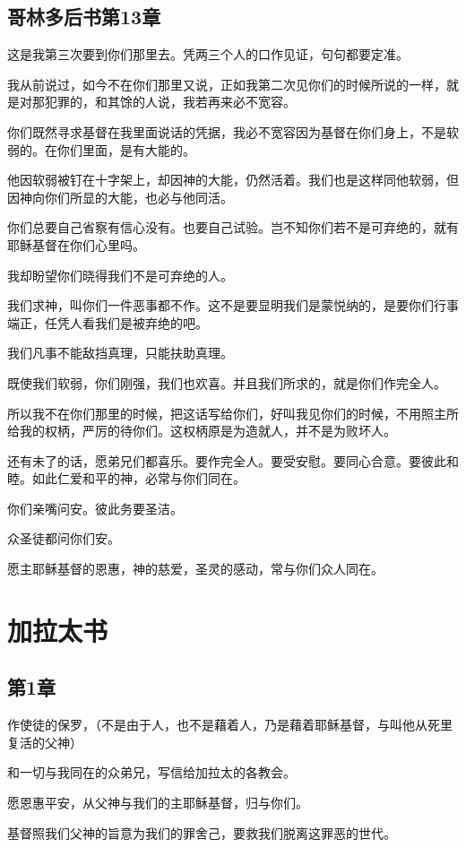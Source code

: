 \documentclass[12pt,oneside]{book}
\begin{document}
\chapter{哥林多后书第13章}
这是我第三次要到你们那里去。凭两三个人的口作见证，句句都要定准。

我从前说过，如今不在你们那里又说，正如我第二次见你们的时候所说的一样，就是对那犯罪的，和其馀的人说，我若再来必不宽容。

你们既然寻求基督在我里面说话的凭据，我必不宽容因为基督在你们身上，不是软弱的。在你们里面，是有大能的。

他因软弱被钉在十字架上，却因神的大能，仍然活着。我们也是这样同他软弱，但因神向你们所显的大能，也必与他同活。

你们总要自己省察有信心没有。也要自己试验。岂不知你们若不是可弃绝的，就有耶稣基督在你们心里吗。

我却盼望你们晓得我们不是可弃绝的人。

我们求神，叫你们一件恶事都不作。这不是要显明我们是蒙悦纳的，是要你们行事端正，任凭人看我们是被弃绝的吧。

我们凡事不能敌挡真理，只能扶助真理。

既使我们软弱，你们刚强，我们也欢喜。并且我们所求的，就是你们作完全人。

所以我不在你们那里的时候，把这话写给你们，好叫我见你们的时候，不用照主所给我的权柄，严厉的待你们。这权柄原是为造就人，并不是为败坏人。

还有未了的话，愿弟兄们都喜乐。要作完全人。要受安慰。要同心合意。要彼此和睦。如此仁爱和平的神，必常与你们同在。

你们亲嘴问安。彼此务要圣洁。

众圣徒都问你们安。

愿主耶稣基督的恩惠，神的慈爱，圣灵的感动，常与你们众人同在。

\part{加拉太书}
\chapter{第1章}
作使徒的保罗，（不是由于人，也不是藉着人，乃是藉着耶稣基督，与叫他从死里复活的父神）

和一切与我同在的众弟兄，写信给加拉太的各教会。

愿恩惠平安，从父神与我们的主耶稣基督，归与你们。

基督照我们父神的旨意为我们的罪舍己，要救我们脱离这罪恶的世代。
\end{document}

